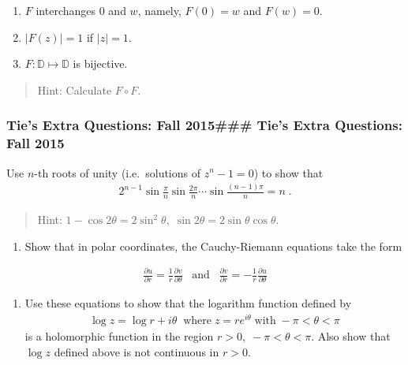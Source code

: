 \begin{enumerate}
\def\labelenumi{(\roman{enumi})}
\setcounter{enumi}{1}
\item
  \(F\) interchanges \(0\) and \(w\), namely, \(F(0) = w\) and
  \(F(w) = 0\).
\item
  \(|F(z)| = 1\) if \(|z| = 1\).
\item
  \(F: {\mathbb D} \mapsto {\mathbb D}\) is bijective.
\end{enumerate}

\begin{quote}
Hint: Calculate \(F \circ F\).
\end{quote}

\hypertarget{ties-extra-questions-fall-2015-ties-extra-questions-fall-2015}{%
\subsubsection{Tie's Extra Questions: Fall 2015\#\#\# Tie's Extra
Questions: Fall
2015}\label{ties-extra-questions-fall-2015-ties-extra-questions-fall-2015}}

Use \(n\)-th roots of unity (i.e.~solutions of \(z^n - 1 =0\)) to show
that
\begin{align*}2^{n-1} \sin\frac{\pi}{n} \sin\frac{2\pi}{n} \cdots \sin\frac{(n-1)\pi}{n}
= n
\; .\end{align*}

\begin{quote}
Hint:
\(1 - \cos 2 \theta = 2 \sin^2 \theta,\; \sin 2 \theta = 2 \sin \theta \cos \theta\).
\end{quote}

\begin{enumerate}
\def\labelenumi{(\alph{enumi})}
\tightlist
\item
  Show that in polar coordinates, the Cauchy-Riemann equations take the
  form
\end{enumerate}

\begin{align*}\frac{\partial u}{\partial r} = \frac{1}{r} \frac{\partial v}{\partial \theta}
\; \; \; \text{and} \; \; \;
\frac{\partial v}{\partial r} = - \frac{1}{r} \frac{\partial u}{\partial \theta}\end{align*}

\begin{enumerate}
\def\labelenumi{(\alph{enumi})}
\setcounter{enumi}{1}
\tightlist
\item
  Use these equations to show that the logarithm function defined by
  \begin{align*}\log z = \log r + i \theta \; \;
  \mbox{where} \; z = r e^{i \theta } \; \mbox{with} \; - \pi < \theta < \pi\end{align*}
  is a holomorphic function in the region
  \(r>0, \; - \pi < \theta < \pi\). Also show that \(\log z\) defined
  above is not continuous in \(r>0\).
\end{enumerate}

